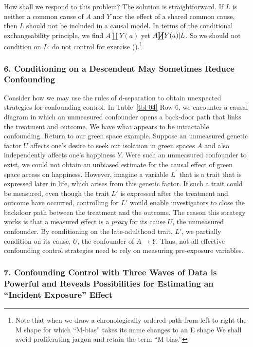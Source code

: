 \documentclass[
  singlecolumn]{article}
\begin{document}
How shall we respond to this problem? The solution is straightforward.
If \(L\) is neither a common cause of \(A\) and \(Y\) nor the effect of
a shared common cause, then \(L\) should not be included in a causal
model. In terms of the conditional exchangeability principle, we find
\(A \coprod Y(a)\) yet \(A \cancel{\coprod} Y(a)| L\). So we should not
condition on \(L\): do not control for exercise
().\footnote{Note that
  when we draw a chronologically ordered path from left to right the M
  shape for which ``M-bias'' takes its name changes to an E shape We
  shall avoid proliferating jargon and retain the term ``M bias.''}

\subsubsection{6. Conditioning on a Descendent May Sometimes Reduce
Confounding}\label{conditioning-on-a-descendent-may-sometimes-reduce-confounding}

Consider how we may use the rules of d-separation to obtain unexpected
strategies for confounding control. In Table~\ref{tbl-04} Row 6, we
encounter a causal diagram in which an unmeasured confounder opens a
back-door path that links the treatment and outcome. We have what
appears to be intractable confounding. Return to our green space
example. Suppose an unmeasured genetic factor \(U\) affects one's desire
to seek out isolation in green spaces \(A\) and also independently
affects one's happiness \(Y\). Were such an unmeasured confounder to
exist, we could not obtain an unbiased estimate for the causal effect of
green space access on happiness. However, imagine a variable
\(L^\prime\) that is a trait that is expressed later in life, which
arises from this genetic factor. If such a trait could be measured, even
though the trait \(L'\) is expressed after the treatment and outcome
have occurred, controlling for \(L'\) would enable investigators to
close the backdoor path between the treatment and the outcome. The
reason this strategy works is that a measured effect is a \emph{proxy}
for its cause \(U\), the unmeasured confounder. By conditioning on the
late-adulthood trait, \(L'\), we partially condition on its cause,
\(U\), the confounder of \(A \to Y\). Thus, not all effective
confounding control strategies need to rely on measuring pre-exposure
variables.

\subsubsection{7. Confounding Control with Three Waves of Data is
Powerful and Reveals Possibilities for Estimating an ``Incident
Exposure''
Effect}\label{confounding-control-with-three-waves-of-data-is-powerful-and-reveals-possibilities-for-estimating-an-incident-exposure-effect}
\end{document}
